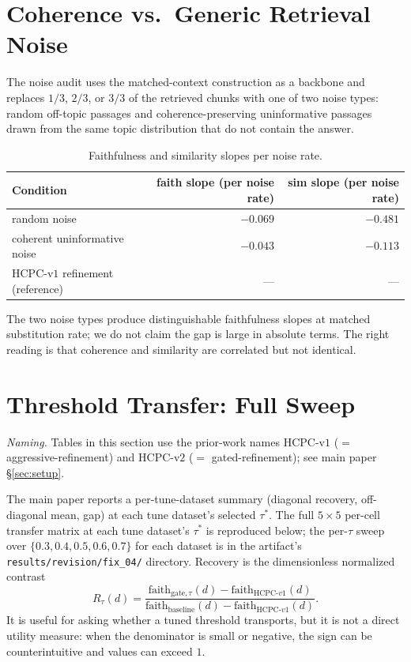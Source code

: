 \section{Coherence vs.\ Generic Retrieval Noise}
\label{app:noise}

The noise audit uses the matched-context construction as a backbone
and replaces $1/3$, $2/3$, or $3/3$ of the retrieved chunks with one
of two noise types: random off-topic passages and coherence-preserving
uninformative passages drawn from the same topic distribution that do
not contain the answer.

\begin{table}[!htb]
\centering
\caption{Faithfulness and similarity slopes per noise rate.}
\footnotesize
\begin{tabular}{lrr}
\toprule
Condition & faith slope (per noise rate) & sim slope (per noise rate) \\
\midrule
random noise                     & $-0.069$ & $-0.481$ \\
coherent uninformative noise     & $-0.043$ & $-0.113$ \\
HCPC-v$1$ refinement (reference) & ---      & ---      \\
\bottomrule
\end{tabular}
\end{table}

The two noise types produce distinguishable faithfulness slopes at
matched substitution rate; we do not claim the gap is large in absolute
terms. The right reading is that coherence and similarity are
correlated but not identical.

\section{Threshold Transfer: Full Sweep}
\label{app:threshold_full}

\noindent\emph{Naming.} Tables in this section use the prior-work
names HCPC-v$1$ ($=$ aggressive-refinement) and HCPC-v$2$
($=$ gated-refinement); see main paper \S\ref{sec:setup}.

The main paper reports a per-tune-dataset summary
(diagonal recovery, off-diagonal mean, gap) at each tune dataset's
selected $\tau^\ast$. The full $5 \times 5$ per-cell transfer matrix at
each tune dataset's $\tau^\ast$ is reproduced below; the per-$\tau$
sweep over $\{0.3, 0.4, 0.5, 0.6, 0.7\}$ for each dataset is in the
artifact's \texttt{results/revision/fix\_04/} directory.
Recovery is the dimensionless normalized contrast
\[
R_\tau(d)=
\frac{\mathrm{faith}_{\mathrm{gate},\tau}(d) -
      \mathrm{faith}_{\mathrm{HCPC}\text{-}v1}(d)}
     {\mathrm{faith}_{\mathrm{baseline}}(d) -
      \mathrm{faith}_{\mathrm{HCPC}\text{-}v1}(d)}.
\]
It is useful for asking whether a tuned threshold transports, but it is
not a direct utility measure: when the denominator is small or negative,
the sign can be counterintuitive and values can exceed $1$.

